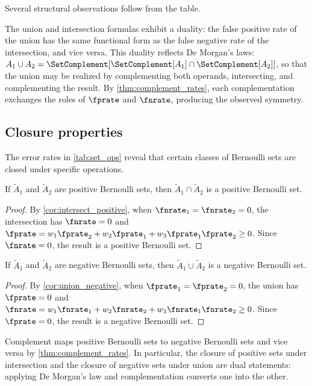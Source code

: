 Several structural observations follow from the table.

The union and intersection formulas exhibit a duality:
the false positive rate of the union has the same functional form as the
false negative rate of the intersection, and vice versa.
This duality reflects De Morgan's laws: $A_1 \cup A_2 =
\SetComplement[\SetComplement[A_1] \cap \SetComplement[A_2]]$, so that
the union may be realized by complementing both operands, intersecting,
and complementing the result.
By \cref{thm:complement_rates}, each complementation exchanges the roles
of $\fprate$ and $\fnrate$, producing the observed symmetry.

\subsection{Closure properties}
\label{sec:closure}
The error rates in \cref{tab:set_ops} reveal that certain classes of
Bernoulli sets are closed under specific operations.

\begin{theorem}
\label{thm:closure_positive_intersect}
If $\tilde{A}_1$ and $\tilde{A}_2$ are positive Bernoulli sets, then
$\tilde{A}_1 \cap \tilde{A}_2$ is a positive Bernoulli set.
\end{theorem}
\begin{proof}
By \cref{cor:intersect_positive}, when $\fnrate_1 = \fnrate_2 = 0$,
the intersection has $\fnrate = 0$ and
$\fprate = w_1 \fprate_2 + w_2 \fprate_1
+ w_3 \fprate_1 \fprate_2 \geq 0$.
Since $\fnrate = 0$, the result is a positive Bernoulli set.
\end{proof}

\begin{theorem}
\label{thm:closure_negative_union}
If $\tilde{A}_1$ and $\tilde{A}_2$ are negative Bernoulli sets, then
$\tilde{A}_1 \cup \tilde{A}_2$ is a negative Bernoulli set.
\end{theorem}
\begin{proof}
By \cref{cor:union_negative}, when $\fprate_1 = \fprate_2 = 0$,
the union has $\fprate = 0$ and
$\fnrate = w_1 \fnrate_1 + w_2 \fnrate_2
+ w_3 \fnrate_1 \fnrate_2 \geq 0$.
Since $\fprate = 0$, the result is a negative Bernoulli set.
\end{proof}

\begin{remark}
Complement maps positive Bernoulli sets to negative Bernoulli sets and vice
versa by \cref{thm:complement_rates}.
In particular, the closure of positive sets under intersection and the
closure of negative sets under union are dual statements: applying
De Morgan's law and complementation converts one into the other.
\end{remark}

